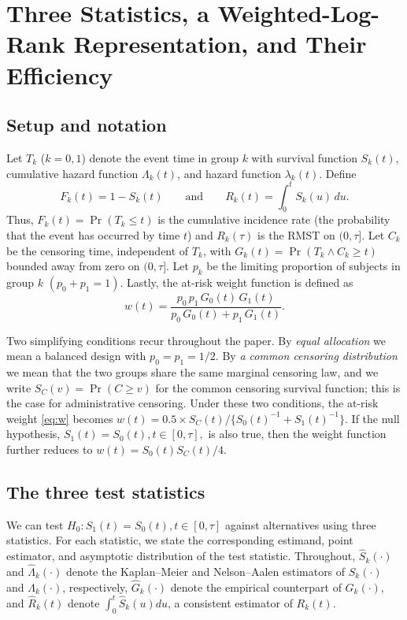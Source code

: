 \documentclass[12pt]{article}
\newcommand{\dd}{\,d}
\begin{document}
\section{Three Statistics, a Weighted-Log-Rank Representation, and Their Efficiency}
\label{sec:setup}

\subsection{Setup and notation}
\label{sec:notation}

Let $T_k$ ($k=0,1$) denote the event time in group $k$ with survival
function $S_k(t)$, cumulative hazard function $\Lambda_k(t)$, and hazard function $\lambda_k(t)$.
Define
\begin{equation}
  F_k(t)=1-S_k(t)\qquad \mbox{and} \qquad R_k(t)=\int_0^t S_k(u)\dd u.
\end{equation}
Thus, $F_k(t)=\Pr(T_k\le t)$ is the cumulative incidence rate (the probability
that the event has occurred by time $t$) and $R_k(\tau)$ is the RMST on $(0,\tau]$.
Let $C_k$ be the censoring time, independent of $T_k$, with
$G_k(t)=\Pr(T_k\wedge C_k\ge t)$ bounded away from zero on $(0,\tau]$.
Let $p_k$ be the limiting proportion of subjects in group $k$ $\left(p_0+p_1=1\right)$.
Lastly, the at-risk weight function is defined as
\begin{equation}\label{eq:w}
  w(t)=\frac{p_0\,p_1\,G_0(t)\,G_1(t)}{p_0\,G_0(t)+p_1\,G_1(t)}.
\end{equation}

Two simplifying conditions recur throughout the paper.
By \emph{equal allocation} we mean a balanced design with $p_0=p_1=1/2.$
By \emph{a common censoring distribution} we mean that the two groups
share the same marginal censoring law, and we write
$S_C(v)=\Pr(C\ge v)$ for the common censoring survival function;
this is the case for administrative censoring.
Under these two conditions, the at-risk weight \eqref{eq:w} becomes $w(t)=0.5\times S_C(t)/\{S_0(t)^{-1}+S_1(t)^{-1}\}.$ If the null hypothesis, $S_1(t)=S_0(t), t\in [0, \tau],$ is also true, then  the weight function further reduces to $w(t)=S_0(t)S_C(t)/4$.



\subsection{The three test statistics}
\label{sec:three-stats}

We can test $H_0:S_1(t)=S_0(t), t\in [0, \tau]$ against alternatives using three
statistics.  For each statistic, we state the corresponding estimand, point estimator, and asymptotic distribution of the test statistic.
Throughout, $\hat S_k(\cdot)$ and
$\hat\Lambda_k(\cdot)$ denote the Kaplan--Meier and Nelson--Aalen estimators of
$S_k(\cdot)$ and $\Lambda_k(\cdot)$, respectively, $\hat G_k(\cdot)$ denote the empirical counterpart of $G_k(\cdot)$, and $\hat{R}_k(t)$ denote $\int_0^t \hat{S}_k(u)du$, a consistent estimator of $R_k(t).$
\end{document}
